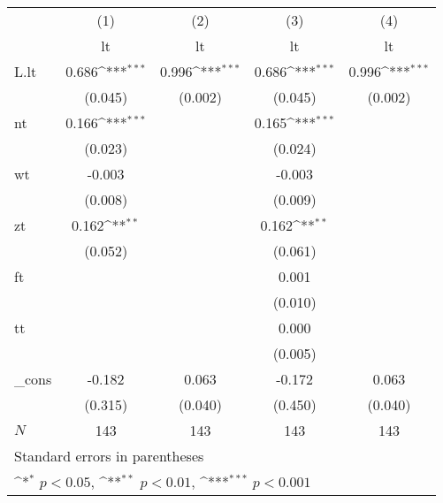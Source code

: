 {
\def\sym#1{\ifmmode^{#1}\else\(^{#1}\)\fi}
\begin{tabular}{l*{4}{c}}
\hline\hline
          &\multicolumn{1}{c}{(1)}&\multicolumn{1}{c}{(2)}&\multicolumn{1}{c}{(3)}&\multicolumn{1}{c}{(4)}\\
          &\multicolumn{1}{c}{lt}&\multicolumn{1}{c}{lt}&\multicolumn{1}{c}{lt}&\multicolumn{1}{c}{lt}\\
\hline
L.lt      &    0.686\sym{***}&    0.996\sym{***}&    0.686\sym{***}&    0.996\sym{***}\\
          &  (0.045)         &  (0.002)         &  (0.045)         &  (0.002)         \\
nt        &    0.166\sym{***}&                  &    0.165\sym{***}&                  \\
          &  (0.023)         &                  &  (0.024)         &                  \\
wt        &   -0.003         &                  &   -0.003         &                  \\
          &  (0.008)         &                  &  (0.009)         &                  \\
zt        &    0.162\sym{**} &                  &    0.162\sym{**} &                  \\
          &  (0.052)         &                  &  (0.061)         &                  \\
ft        &                  &                  &    0.001         &                  \\
          &                  &                  &  (0.010)         &                  \\
tt        &                  &                  &    0.000         &                  \\
          &                  &                  &  (0.005)         &                  \\
\_cons    &   -0.182         &    0.063         &   -0.172         &    0.063         \\
          &  (0.315)         &  (0.040)         &  (0.450)         &  (0.040)         \\
\hline
\(N\)     &      143         &      143         &      143         &      143         \\
\hline\hline
\multicolumn{5}{l}{\footnotesize Standard errors in parentheses}\\
\multicolumn{5}{l}{\footnotesize \sym{*} \(p<0.05\), \sym{**} \(p<0.01\), \sym{***} \(p<0.001\)}\\
\end{tabular}
}
